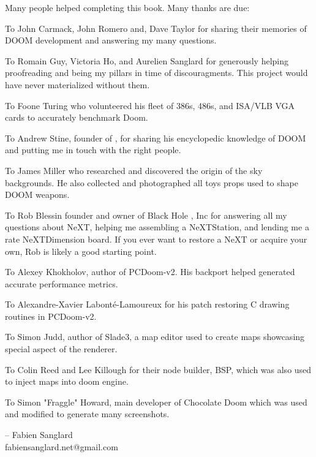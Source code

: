 Many people helped completing this book. Many thanks are due:\\
\par
To John Carmack, John Romero and, Dave Taylor for sharing their memories of DOOM development and answering my many questions.\\
\par
To Romain Guy, Victoria Ho, and Aurelien Sanglard for generously helping proofreading and being my pillars in time of discouragments. This project would have never materialized without them.\\ 
\par
To Foone Turing who volunteered his fleet of 386s, 486s, and ISA/VLB VGA cards to accurately benchmark Doom.\\
\par
To Andrew Stine, founder of , for sharing his encyclopedic knowledge of DOOM and putting me in touch with the right people.\\
\par
To James Miller who researched and discovered the origin of the sky backgrounds. He also collected and photographed all toys props used to shape DOOM weapons.\\
\par
To Rob Blessin founder and owner of Black Hole , Inc for answering all my questions about NeXT, helping me assembling a NeXTStation, and lending me a rate NeXTDimension board. If you ever want to restore a NeXT or acquire your own, Rob is likely a good starting point.\\
\par
To Alexey Khokholov, author of PCDoom-v2. His backport helped generated accurate performance metrics.\\
\par
To Alexandre-Xavier Labont\'e-Lamoureux for his patch restoring C drawing routines in PCDoom-v2.\\
\par
To Simon Judd, author of Slade3, a map editor used to create maps showcasing special aspect of the renderer.\\
\par
To Colin Reed and Lee Killough for their node builder, BSP, which was also used to inject maps into doom engine.\\
\par
To Simon "Fraggle" Howard, main developer of Chocolate Doom which was used and modified to generate many screenshots.\\
\par
-- Fabien Sanglard\\
fabiensanglard.net@gmail.com
